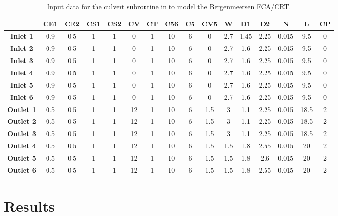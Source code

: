 \begin{table}[H]
\caption{Input data for the culvert subroutine in  to model the Bergenmeersen FCA/CRT.}\label{tab:bergenmeersen_table2}
\small
\begin{center}\begin{tabular}{|c|c|c|c|c|c|c|c|c|c|c|c|c|c|c|c|}
\hline
~ & \textbf{CE1} & \textbf{CE2} & \textbf{CS1} & \textbf{CS2} & \textbf{CV} & \textbf{CT} & \textbf{C56} & \textbf{C5} & \textbf{CV5} & \textbf{W} & \textbf{D1} & \textbf{D2} & \textbf{N} & \textbf{L} & \textbf{CP}\\
\hline
\textbf{Inlet 1} & 0.9 & 0.5 & 1 & 1 & 0 & 1 & 10 & 6 & 0 & 2.7 & 1.45 & 2.25 & 0.015 & 9.5 & 0 \\
\hline
\textbf{Inlet 2} & 0.9 & 0.5 & 1 & 1 & 0 & 1 & 10 & 6 & 0 & 2.7 & 1.6 & 2.25 & 0.015 & 9.5 & 0 \\
\hline
\textbf{Inlet 3} & 0.9 & 0.5 & 1 & 1 & 0 & 1 & 10 & 6 & 0 & 2.7 & 1.6 & 2.25 & 0.015 & 9.5 & 0 \\
\hline
\textbf{Inlet 4} & 0.9 & 0.5 & 1 & 1 & 0 & 1 & 10 & 6 & 0 & 2.7 & 1.6 & 2.25 & 0.015 & 9.5 & 0 \\
\hline
\textbf{Inlet 5} & 0.9 & 0.5 & 1 & 1 & 0 & 1 & 10 & 6 & 0 & 2.7 & 1.6 & 2.25 & 0.015 & 9.5 & 0 \\
\hline
\textbf{Inlet 6} & 0.9 & 0.5 & 1 & 1 & 0 & 1 & 10 & 6 & 0 & 2.7 & 1.6 & 2.25 & 0.015 & 9.5 & 0 \\
\hline
\textbf{Outlet 1} & 0.5 & 0.5 & 1 & 1 & 12 & 1 & 10 & 6 & 1.5 & 3 & 1.1 & 2.25 & 0.015 & 18.5 & 2 \\
\hline
\textbf{Outlet 2} & 0.5 & 0.5 & 1 & 1 & 12 & 1 & 10 & 6 & 1.5 & 3 & 1.1 & 2.25 & 0.015 & 18.5 & 2 \\
\hline
\textbf{Outlet 3} & 0.5 & 0.5 & 1 & 1 & 12 & 1 & 10 & 6 & 1.5 & 3 & 1.1 & 2.25 & 0.015 & 18.5 & 2 \\
\hline
\textbf{Outlet 4} & 0.5 & 0.5 & 1 & 1 & 12 & 1 & 10 & 6 & 1.5 & 1.5 & 1.8 & 2.55 & 0.015 & 20 & 2 \\
\hline
\textbf{Outlet 5} & 0.5 & 0.5 & 1 & 1 & 12 & 1 & 10 & 6 & 1.5 & 1.5 & 1.8 & 2.6 & 0.015 & 20 & 2 \\
\hline
\textbf{Outlet 6} & 0.5 & 0.5 & 1 & 1 & 12 & 1 & 10 & 6 & 1.5 & 1.5 & 1.8 & 2.55 & 0.015 & 20 & 2 \\
\hline
\end{tabular}\end{center}\normalsize
\end{table}

\section{Results}

